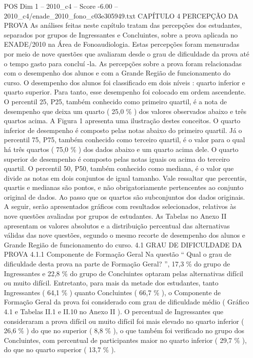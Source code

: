 \begin{textsample}{POS Dim 1 – 2010\_c4 – Score -6.00 – 2010\_c4/enade\_2010\_fono\_c03e305949.txt}  \label{ex:f1_pos_403}
CAPÍTULO 4 PERCEPÇÃO DA PROVA As análises feitas neste capítulo tratam das percepções dos estudantes, separados por grupos de Ingressantes e Concluintes, sobre a prova aplicada no ENADE/2010 na Área de Fonoaudiologia.
Estas percepções foram mensuradas por meio de nove questões que avaliaram desde o grau de dificuldade da prova até o tempo gasto para concluí -la.
As percepções sobre a prova foram relacionadas com o desempenho dos alunos e com a Grande Região de funcionamento do curso.
O desempenho dos alunos foi classificado em dois níveis : quarto inferior e quarto superior.
Para tanto, esse desempenho foi colocado em ordem ascendente.
O percentil 25, P25, também conhecido como primeiro quartil, é a nota de desempenho que deixa um quarto ( 25,0 \% ) dos valores observados abaixo e três quartos acima.
A Figura 1 apresenta uma ilustração destes conceitos.
O quarto inferior de desempenho é composto pelas notas abaixo do primeiro quartil.
Já o percentil 75, P75, também conhecido como terceiro quartil, é o valor para o qual há três quartos ( 75,0 \% ) dos dados abaixo e um quarto acima dele.
O quarto superior de desempenho é composto pelas notas iguais ou acima do terceiro quartil.
O percentil 50, P50, também conhecido como mediana, é o valor que divide as notas em dois conjuntos de igual tamanho.
Vale ressaltar que percentis, quartis e medianas são pontos, e não obrigatoriamente pertencentes ao conjunto original de dados.
Ao passo que os quartos são subconjuntos dos dados originais.
A seguir, serão apresentados gráficos com resultados selecionados, relativos às nove questões avaliadas por grupos de estudantes.
As Tabelas no Anexo II apresentam os valores absolutos e a distribuição percentual das alternativas válidas das nove questões, segundo o mesmo recorte de desempenho dos alunos e Grande Região de funcionamento do curso. 4.1 GRAU DE DIFICULDADE DA PROVA 4.1.1 Componente de Formação Geral Na questão “ Qual o grau de dificuldade desta prova na parte de Formação Geral? ”, 17,3 \% do grupo de Ingressantes e 22,8 \% do grupo de Concluintes optaram pelas alternativas difícil ou muito difícil.
Entretanto, para mais da metade dos estudantes, tanto Ingressantes ( 64,1 \% ) quanto Concluintes ( 66,7 \% ), o Componente de Formação Geral da prova foi considerado com grau de dificuldade médio ( Gráfico 4.1 e Tabelas II.1 e II.10 no Anexo II ).
O percentual de Ingressantes que consideraram a prova difícil ou muito difícil foi mais elevado no quarto inferior ( 26,6 \% ) do que no superior ( 8,8 \% ), o que também foi verificado no grupo dos Concluintes, com percentual de participantes maior no quarto inferior ( 29,7 \% ), do que no quarto superior ( 13,7 \% ).

\end{textsample}
